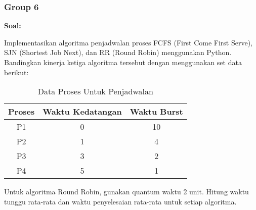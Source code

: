 \documentclass[12pt]{article}
\begin{document}
\subsubsection{Group 6}
\textbf{Soal:}

Implementasikan algoritma penjadwalan proses FCFS (First Come First Serve), SJN (Shortest Job Next), dan RR (Round Robin) menggunakan Python. Bandingkan kinerja ketiga algoritma tersebut dengan menggunakan set data berikut:
    \begin{table}[h] %
        \centering
        \begin{tabular}{|c|c|c|} %
        \hline
        Proses & Waktu Kedatangan & Waktu Burst \\ %
        \hline
        P1 & 0 & 10 \\ %
        \hline
        P2 & 1 & 4 \\ %
        \hline
        P3 & 3 & 2 \\
        \hline
        P4 & 5 & 1 \\
        \hline
        \end{tabular}
        \caption{Data Proses Untuk Penjadwalan} %
        \label{tab:Data Proses Untuk Penjadwalan} %
    \end{table}

Untuk algoritma Round Robin, gunakan quantum waktu 2 unit. Hitung waktu tunggu rata-rata dan waktu penyelesaian rata-rata untuk setiap algoritma.
\end{document}
